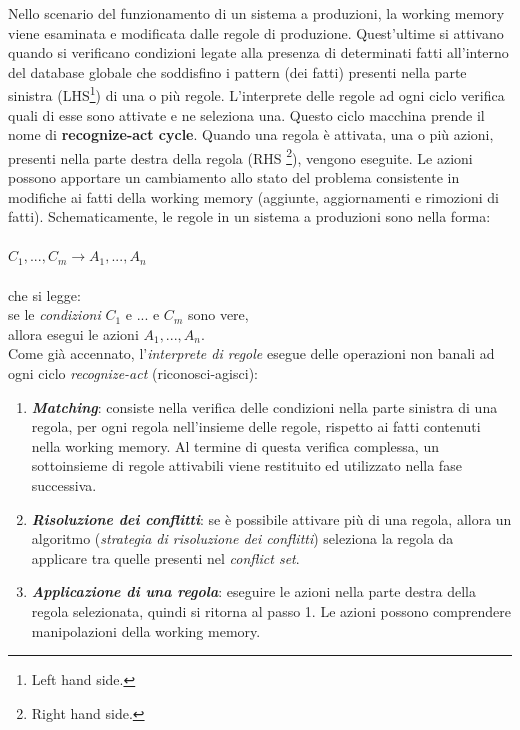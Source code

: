 Nello scenario del funzionamento di un sistema a produzioni, la working memory viene esaminata e modificata dalle regole di produzione. Quest'ultime si attivano quando si verificano condizioni legate alla presenza di determinati fatti all'interno del database globale che soddisfino i pattern (dei fatti) presenti nella parte sinistra (LHS\footnote{Left hand side.}) di una o più regole. L'interprete delle regole ad ogni ciclo verifica quali di esse sono attivate e ne seleziona una. Questo ciclo macchina prende il nome di \textbf{recognize-act cycle}. Quando una regola è attivata, una o più azioni, presenti nella parte destra della regola (RHS \footnote{Right hand side.}), vengono eseguite. Le azioni possono apportare un cambiamento allo stato del problema consistente in modifiche ai fatti della working memory (aggiunte, aggiornamenti e rimozioni di fatti). Schematicamente, le regole in un sistema a produzioni sono nella forma:\\
\\
\indent $C_1, ..., C_m \rightarrow A_1, ..., A_n$\\
\\che si legge: \\
\indent se le \emph{condizioni} $C_1$ e ... e $C_m$ sono vere,\\
\indent allora esegui le azioni $A_1, ..., A_n$. \\

Come già accennato, l'\emph{interprete di regole} esegue delle operazioni non banali ad ogni ciclo \emph{recognize-act} (riconosci-agisci):
\begin{enumerate}
\item \textbf{\emph{Matching}}: consiste nella verifica delle condizioni nella parte sinistra di una regola, per ogni regola nell'insieme delle regole, rispetto ai fatti contenuti nella working memory. Al termine di questa verifica complessa, un sottoinsieme di regole attivabili viene restituito ed utilizzato nella fase successiva. 
\item \textbf{\emph{Risoluzione dei conflitti}}: se è possibile attivare più di una regola, allora un algoritmo (\emph{strategia di risoluzione dei conflitti}) seleziona la regola da applicare tra quelle presenti nel \emph{conflict set}. 
\item \textbf{\emph{Applicazione di una regola}}: eseguire le azioni nella parte destra della regola selezionata, quindi si ritorna al passo 1. Le azioni possono comprendere manipolazioni della working memory.
\end{enumerate}

